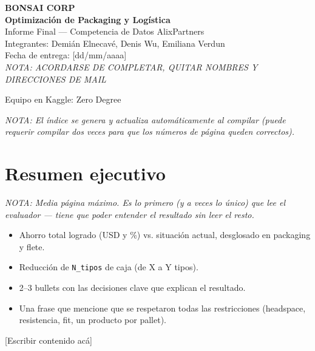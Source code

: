\documentclass[11pt]{article}
\newcommand{\nota}[1]{{\itshape\color{notegray}\small NOTA: #1}\par\vspace{2pt}}
\newenvironment{notalist}{\begin{itemize}[itemsep=1pt,topsep=2pt,leftmargin=1.4em]\itshape\color{notegray}\small}{\end{itemize}\vspace{2pt}}
\newcommand{\placeholder}{\color{placeholdergray}[Escribir contenido acá]\color{black}\par\vspace{6pt}}
\begin{document}
\begin{titlepage}
\centering
\vspace*{4cm}
{\color{bonsaigreen}\bfseries\large BONSAI CORP}\\[0.6cm]
{\bfseries\Huge Optimización de Packaging y Logística}\\[0.4cm]
{\color{notegray}\Large Informe Final --- Competencia de Datos AlixPartners}\\[2cm]

\large
Integrantes: Demián Elnecavé, Denis Wu, Emiliana Verdun\\[0.3cm]
Fecha de entrega: [dd/mm/aaaa]\\[0.3cm]
\nota{\color{red}ACORDARSE DE COMPLETAR, QUITAR NOMBRES Y DIRECCIONES DE MAIL}


Equipo en Kaggle: Zero Degree\\[0.3cm]

\end{titlepage}

\tableofcontents
\nota{El índice se genera y actualiza automáticamente al compilar (puede requerir compilar dos veces para que los números de página queden correctos).}
\newpage

\section{Resumen ejecutivo}

\nota{Media página máximo. Es lo primero (y a veces lo único) que lee el evaluador --- tiene que poder entender el resultado sin leer el resto.}
\begin{notalist}
\item Ahorro total logrado (USD y \%) vs. situación actual, desglosado en packaging y flete.
\item Reducción de \texttt{N\_tipos} de caja (de X a Y tipos).
\item 2--3 bullets con las decisiones clave que explican el resultado.
\item Una frase que mencione que se respetaron todas las restricciones (headspace, resistencia, fit, un producto por pallet).
\end{notalist}
\placeholder
\end{document}

